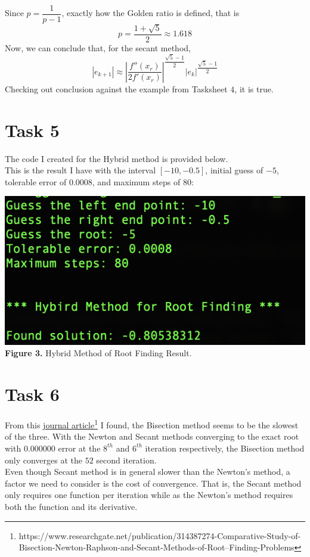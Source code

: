 \documentclass{article}
\begin{document}
Since $p = \dfrac{1}{p-1}$, exactly how the Golden ratio is defined, that is
$$p = \dfrac{1+\sqrt{5}}{2} \approx 1.618$$
Now, we can conclude that, for the secant method, 
$$\left|e_{k+1}\right| \approx \left|\dfrac{f''(x_r)}{2f'(x_r)}\right|^{\dfrac{\sqrt{5} - 1}{2}}\left|e_k\right|^{\dfrac{\sqrt{5} - 1}{2}}$$
Checking out conclusion against the example from Tasksheet $4$, it is true.

\section*{Task 5}
The code I created for the Hybrid method is provided below.\\

This is the result I have with the interval $\left[-10, -0.5\right]$, initial guess of $-5$, tolerable error of $0.0008$, and maximum steps of $80$:
\begin{center}
\includegraphics[width=\textwidth]{Screenshots/Hybrid.png}
{\bf Figure 3.} Hybrid Method of Root Finding Result.
\end{center}
\section*{Task 6}
From this \href{https://www.researchgate.net/publication/314387274_Comparative_Study_of_Bisection_Newton-Raphson_and_Secant_Methods_of_Root-_Finding_Problems}{journal article}\footnote{https://www.researchgate.net/publication/314387274-Comparative-Study-of-Bisection-Newton-Raphson-and-Secant-Methods-of-Root--Finding-Problems} I found, the Bisection method seems to be the slowest of the three. With the Newton and Secant methods converging to the exact root with $0.000000$ error at the $8^{th}$ and $6^{th}$ iteration respectively, the Bisection method only converges at the $52$ second iteration.\\
Even though Secant method is in general slower than the Newton's method, a factor we need to consider is the cost of convergence. That is, the Secant method only requires one function per iteration while as the Newton's method requires both the function and its derivative.
\end{document}
